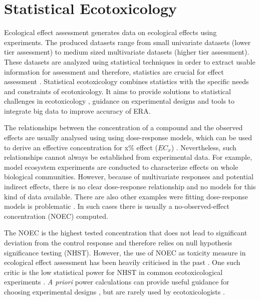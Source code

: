 
\section{Statistical Ecotoxicology}
Ecological effect assessment generates data on ecological effects using experiments. 
The produced datasets range from small univariate datasets (lower tier assessment) to medium sized multivariate datasets (higher tier assessment).
These datasets are analyzed using statistical techniques in order to extract usable information for assessment and therefore, statistics are crucial for effect assessment \citep{newman_quantitative_2012}.
Statistical ecotoxicology combines statistics with the specific needs and constraints of ecotoxicology. 
It aims to provide solutions to statistical challenges in ecotoxicology \citep{fox_comment_2016}, guidance on experimental designs \citep{johnson_power_2015} and tools to integrate big data \citep {van_den_brink_new_2016} to improve accuracy of ERA. 

The relationships between the concentration of a compound and the observed effects are usually analysed using using dose-response models, which can be used to derive an effective concentration for x\% effect ($EC_{x}$) \citep{ritz_toward_2010}. 
Nevertheless, such relationships cannot always be established from experimental data.
For example, model ecosystem experiments are conducted to characterize effects on whole biological communities.
However, because of multivariate responses and potential indirect effects, there is no clear dose-response relationship and no models for this kind of data available. 
There are also other examples were fitting dose-response models is problematic \citep{green_issues_2016}. 
In such cases there is usually a no-observed-effect concentration (NOEC) computed. 

The NOEC is the highest tested concentration that does not lead to significant deviation from the control response and therefore relies on null hypothesis significance testing (NHST). 
However, the use of NOEC as toxicity measure in ecological effect assessment has been heavily criticised in the past \citep{laskowski_good_1995, chapman_warning:_1996, warne_noec_2008, fox_what_2012, jager_bad_2012, fox_dont_2016}. 
One such critic is the low statistical power for NHST in common ecotoxicological experiments \citep{van_der_hoeven_power_1998}.
\emph{A priori} power calculations can provide useful guidance for choosing experimental designs \citep{johnson_power_2015}, but are rarely used by ecotoxicologists \citep{newman_what_2008}. 

